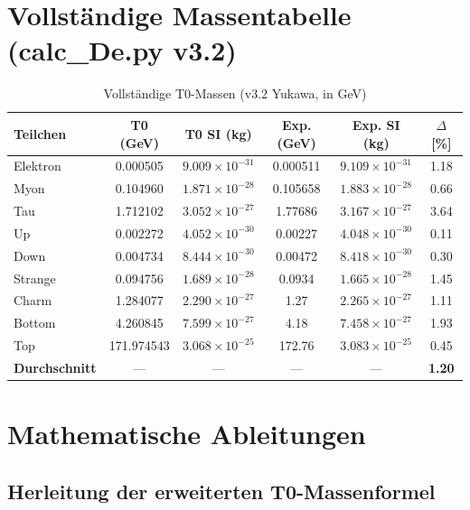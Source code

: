 	\section{Vollständige Massentabelle (calc\_De.py v3.2)}
	
	\begin{table}[h]
		\centering
		\small
		\begin{tabular}{lccccc}
			\toprule
			\textbf{Teilchen} & \textbf{T0 (GeV)} & \textbf{T0 SI (kg)} & \textbf{Exp. (GeV)} & \textbf{Exp. SI (kg)} & \textbf{$\Delta$ [\%]} \\
			\midrule
			Elektron & 0.000505 & $9.009 \times 10^{-31}$ & 0.000511 & $9.109 \times 10^{-31}$ & 1.18 \\
			Myon & 0.104960 & $1.871 \times 10^{-28}$ & 0.105658 & $1.883 \times 10^{-28}$ & 0.66 \\
			Tau & 1.712102 & $3.052 \times 10^{-27}$ & 1.77686 & $3.167 \times 10^{-27}$ & 3.64 \\
			Up & 0.002272 & $4.052 \times 10^{-30}$ & 0.00227 & $4.048 \times 10^{-30}$ & 0.11 \\
			Down & 0.004734 & $8.444 \times 10^{-30}$ & 0.00472 & $8.418 \times 10^{-30}$ & 0.30 \\
			Strange & 0.094756 & $1.689 \times 10^{-28}$ & 0.0934 & $1.665 \times 10^{-28}$ & 1.45 \\
			Charm & 1.284077 & $2.290 \times 10^{-27}$ & 1.27 & $2.265 \times 10^{-27}$ & 1.11 \\
			Bottom & 4.260845 & $7.599 \times 10^{-27}$ & 4.18 & $7.458 \times 10^{-27}$ & 1.93 \\
			Top & 171.974543 & $3.068 \times 10^{-25}$ & 172.76 & $3.083 \times 10^{-25}$ & 0.45 \\
			\midrule
			\textbf{Durchschnitt} & --- & --- & --- & --- & \textbf{1.20} \\
			\bottomrule
		\end{tabular}
		\caption{Vollständige T0-Massen (v3.2 Yukawa, in GeV)}
		\label{tab:massen_v32}
	\end{table}
	
	\section{Mathematische Ableitungen}
	\label{app:mathematics}
	
	\subsection{Herleitung der erweiterten T0-Massenformel}
	

